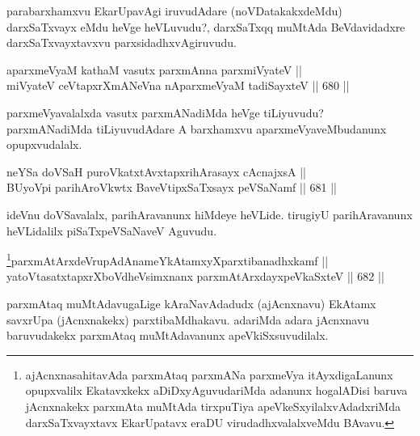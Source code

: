 \begin{artha} 
parabarxhamxvu EkarUpavAgi iruvudAdare (noVDatakakxdeMdu) darxSaTxvayx eMdu heVge heVLuvudu?, darxSaTxqq muMtAda BeVdavidadxre darxSaTxvayxtavxvu parxsidadhxvAgiruvudu.
\end{artha}


\begin{shl}
aparxmeVyaM kathaM vasutx parxmAnna parxmiVyateV || \\
miVyateV ceVtapxrXmANeVna nAparxmeVyaM tadiSayxteV \hfill || 680 ||  
\end{shl}

\begin{artha} 
parxmeVyavalalxda vasutx parxmANadiMda heVge tiLiyuvudu? parxmANadiMda 
tiLiyuvudAdare A barxhamxvu aparxmeVyaveMbudanunx opupxvudalalx.
\end{artha}


\begin{shl}
neYSa doVSaH puroVkatxtAvxtapxrihArasayx cAcnajxsA || \\
BUyoV\s pi parihAroVkwtx BaveVtipxSaTxsayx peVSaNamf \hfill || 681 ||  
\end{shl}

\begin{artha} 
ideVnu doVSavalalx, parihAravanunx hiMdeye heVLide. tirugiyU 
parihAravanunx heVLidalilx piSaTxpeVSaNaveV Aguvudu.
\end{artha}


\begin{shl}
\footnote{ajAcnxnasahitavAda parxmAtaq parxmANa parxmeVya itAyxdigaLanunx opupxvalilx Ekatavxkekx aDiDxyAguvudariMda adanunx hogalADisi baruva jAcnxnakekx parxmAta muMtAda tirxpuTiya apeVkeSxyilalxvAdadxriMda darxSaTxvayxtavx EkarUpatavx eraDU virudadhxvalalxveMdu BAvavu.}parxmAtArxdeVrupAdAnameYkAtamxyXparxtibanadhxkamf || \\
yatoV\s tasatxtapxrXboVdheV\s simxnanx parxmAtArxdayxpeVkaSxteV \hfill || 682 ||  
\end{shl}

\begin{artha} 
parxmAtaq muMtAdavugaLige kAraNavAdadudx (ajAcnxnavu) EkAtamx savxrUpa (jAcnxnakekx) parxtibaMdhakavu. adariMda adara jAcnxnavu baruvudakekx parxmAtaq muMtAdavanunx apeVkiSxsuvudilalx.
\end{artha}

